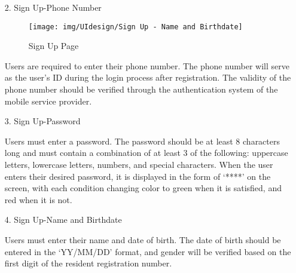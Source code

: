 \documentclass[conference]{IEEEtran}
\begin{document}
\begin{enumerate}
\begin{itemize}
\begin{itemize}
\begin{enumerate}
    
\begin{enumerate}
    \item[2.] Sign Up-Phone Number
    \begin{figure}[h]
        {\centering
        \hspace{4cm}
        \begin{minipage}{0.4\columnwidth}
            \texttt{[image: img/UIdesign/Sign Up - Name and Birthdate]}
            \caption{Sign Up Page}
        \end{minipage}}
    \end{figure}
    
    Users are required to enter their phone number. The phone number will serve as the user’s ID during the login process after registration. The validity of the phone number should be verified through the authentication system of the mobile service provider. \\ 
\end{enumerate}

\begin{enumerate}
    \item[3.] Sign Up-Password
    
    Users must enter a password. The password should be at least 8 characters long and must contain a combination of at least 3 of the following: uppercase letters, lowercase letters, numbers, and special characters. When the user enters their desired password, it is displayed in the form of ‘****’ on the screen, with each condition changing color to green when it is satisfied, and red when it is not. \\ 
\end{enumerate}

\begin{enumerate}
    \item[4.] Sign Up-Name and Birthdate
    
    Users must enter their name and date of birth. The date of birth should be entered in the ‘YY/MM/DD’ format, and gender will be verified based on the first digit of the resident registration number. \\ 
\end{enumerate}

\clearpage


\end{enumerate}
\end{itemize}
\end{itemize}
\end{enumerate}
\end{document}
